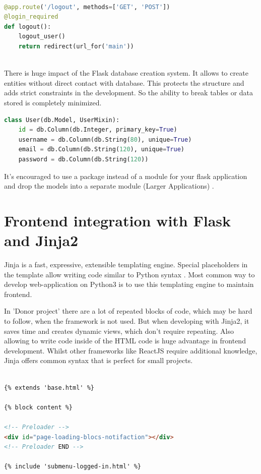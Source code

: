\begin{lstlisting}[language=Python]

@app.route('/logout', methods=['GET', 'POST'])
@login_required
def logout():
    logout_user()
    return redirect(url_for('main'))
    
\end{lstlisting}

\par
There is huge impact of the Flask database creation system. It allows to create entities without direct contact with database. This protects the structure and adds strict constraints in the development. So the ability to break tables or data stored is completely minimized.
\begin{lstlisting}[language=Python]
class User(db.Model, UserMixin):
    id = db.Column(db.Integer, primary_key=True)
    username = db.Column(db.String(80), unique=True)
    email = db.Column(db.String(120), unique=True)
    password = db.Column(db.String(120))
\end{lstlisting}
\par
It’s encouraged to use a package instead of a module for your flask application and drop the models into a separate module (Larger Applications) \cite{flasksql}.

\section{Frontend integration with Flask and Jinja2}
Jinja is a fast, expressive, extensible templating engine. Special placeholders in the template allow writing code similar to Python syntax \cite{jinja}.
Most common way to develop web-application on Python3 is to use this templating engine  to maintain frontend. 
\par
In 'Donor project' there are a lot of repeated blocks of code, which may be hard to follow, when the framework is not used. But when developing with Jinja2, it saves time and creates dynamic views, which don't require repeating. 
Also allowing to write code inside of the HTML code is huge advantage in frontend development. Whilst other frameworks like ReactJS require additional knowledge, Jinja offers common syntax that is perfect for small projects.
\begin{lstlisting}[language=HTML]

{% extends 'base.html' %}

{% block content %}

<!-- Preloader -->
<div id="page-loading-blocs-notifaction"></div>
<!-- Preloader END -->

{% include 'submenu-logged-in.html' %}

\end{lstlisting}

